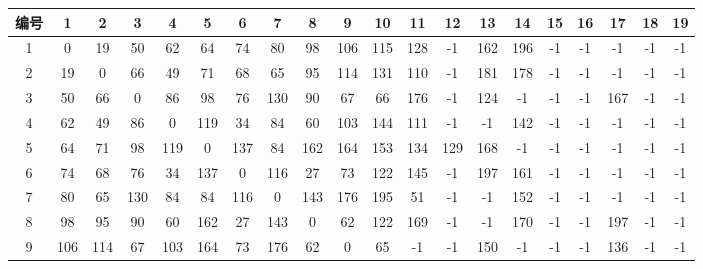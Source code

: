 \documentclass[UTF8,12pt]{ctexart}
\begin{document}
\begin{enumerate}
\begin{itemize}
\begin{table}[H]
{\begin{scriptsize}
                    \begin{tabular}{cccccccccccccccccccc}
                        \toprule
                        编号   & 1      & 2      & 3      & 4      & 5      & 6      & 7      & 8      & 9      & 10     & 11     & 12     & 13     & 14     & 15     & 16     & 17     & 18     & 19 \\
                        \midrule
                        1  & 0      & 19     & 50     & 62     & 64     & 74     & 80     & 98     & 106    & 115    & 128    & -1     & 162    & 196    & -1     & -1     & -1     & -1     & -1  \\
                        \midrule
                        2  & 19     & 0      & 66     & 49     & 71     & 68     & 65     & 95     & 114    & 131    & 110    & -1     & 181    & 178    & -1     & -1     & -1     & -1     & -1  \\
                        \midrule
                        3  & 50     & 66     & 0      & 86     & 98     & 76     & 130    & 90     & 67     & 66     & 176    & -1     & 124    & -1     & -1     & -1     & 167    & -1     & -1  \\
                        \midrule
                        4  & 62     & 49     & 86     & 0      & 119    & 34     & 84     & 60     & 103    & 144    & 111    & -1     & -1     & 142    & -1     & -1     & -1     & -1     & -1  \\
                        \midrule
                        5  & 64     & 71     & 98     & 119    & 0      & 137    & 84     & 162    & 164    & 153    & 134    & 129    & 168    & -1     & -1     & -1     & -1     & -1     & -1  \\
                        \midrule
                        6  & 74     & 68     & 76     & 34     & 137    & 0      & 116    & 27     & 73     & 122    & 145    & -1     & 197    & 161    & -1     & -1     & -1     & -1     & -1  \\
                        \midrule
                        7  & 80     & 65     & 130    & 84     & 84     & 116    & 0      & 143    & 176    & 195    & 51     & -1     & -1     & 152    & -1     & -1     & -1     & -1     & -1  \\
                        \midrule
                        8  & 98     & 95     & 90     & 60     & 162    & 27     & 143    & 0      & 62     & 122    & 169    & -1     & -1     & 170    & -1     & -1     & 197    & -1     & -1  \\
                        \midrule
                        9  & 106    & 114    & 67     & 103    & 164    & 73     & 176    & 62     & 0      & 65     & -1     & -1     & 150    & -1     & -1     & -1     & 136    & -1     & -1  \\

\end{tabular}
\end{scriptsize}}
\end{table}
\end{itemize}
\end{enumerate}
\end{document}
